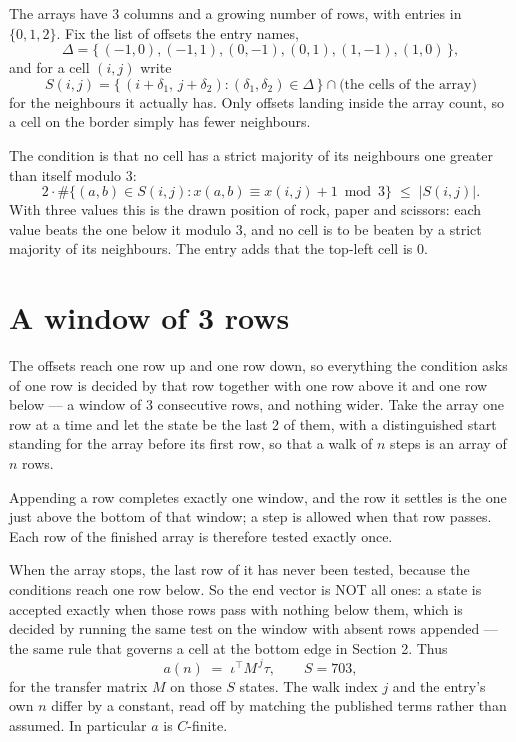 \documentclass[11pt,a4paper]{article}
\theoremstyle{plain}
\theoremstyle{definition}
\begin{document}
The arrays have $3$ columns and a growing number of rows, with entries in $\{0,1,2\}$. Fix the
list of offsets the entry names,
\[
\Delta=\{\,(-1,0), (-1,1), (0,-1), (0,1), (1,-1), (1,0)\,\},
\]
and for a cell $(i,j)$ write
\[
S(i,j)=\{\,(i+\delta_1,\,j+\delta_2) : (\delta_1,\delta_2)\in\Delta\,\}\cap
\text{(the cells of the array)}
\]
for the neighbours it actually has. Only offsets landing inside the array count, so a cell on
the border simply has fewer neighbours.

The condition is that no cell has a strict majority of its neighbours one greater than itself modulo $3$:
\[
2\cdot\#\{(a,b)\in S(i,j) : x(a,b)\equiv x(i,j)+1 \bmod 3\}\;\le\;|S(i,j)| .
\]
With three values this is the drawn position of rock, paper and scissors: each value beats the one below it modulo $3$, and no cell is to be beaten by a strict majority of its neighbours. The entry adds that the top-left cell is $0$.

\section{A window of 3 rows}

The offsets reach one row up and one row down, so everything the condition asks of one row is
decided by that row together with one row above it and one row below --- a window of
$3$ consecutive rows, and nothing wider. Take the array one row at a time
and let the state be the last 2 of them, with a distinguished start standing for the
array before its first row, so that a walk of $n$ steps is an array of $n$ rows.

Appending a row completes exactly one window, and the row it settles is the one just above the bottom of that window; a step is
allowed when that row passes. Each row of the finished
array is therefore tested exactly once.

When the array stops, the last row of it has never been tested, because the
conditions reach one row below. So the end vector is NOT all ones: a state is accepted exactly when
those rows pass with nothing below them, which is decided by running the same test on the window
with absent rows appended --- the same rule that governs a cell at the bottom edge in
Section 2.
Thus
\[
a(n)\;=\;\iota^{\!\top}M^{\,j}\tau ,\qquad S=703,
\]
for the transfer matrix $M$ on those $S$ states. The walk index $j$ and the entry's own $n$
differ by a constant, read off by matching the published terms rather than assumed. In
particular $a$ is $C$-finite.
\end{document}
